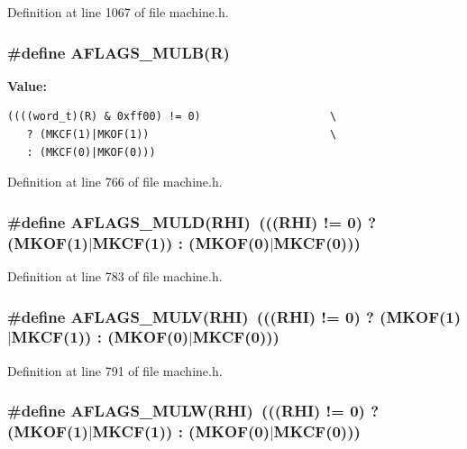 Definition at line 1067 of file machine.h.
\subsubsection[{AFLAGS\_\-MULB}]{\setlength{\rightskip}{0pt plus 5cm}\#define AFLAGS\_\-MULB(R)}\label{machine_8h_318743491cc7dcf91bdaf5f94cad91da}


\textbf{Value:}

\begin{Code}\begin{verbatim}((((word_t)(R) & 0xff00) != 0)                    \
   ? (MKCF(1)|MKOF(1))                            \
   : (MKCF(0)|MKOF(0)))
\end{verbatim}
\end{Code}


Definition at line 766 of file machine.h.
\subsubsection[{AFLAGS\_\-MULD}]{\setlength{\rightskip}{0pt plus 5cm}\#define AFLAGS\_\-MULD(RHI)~(((RHI) != 0) ? (MKOF(1)$|$MKCF(1)) : (MKOF(0)$|$MKCF(0)))}\label{machine_8h_982001aea3d214f048dbc879a408b539}




Definition at line 783 of file machine.h.
\subsubsection[{AFLAGS\_\-MULV}]{\setlength{\rightskip}{0pt plus 5cm}\#define AFLAGS\_\-MULV(RHI)~(((RHI) != 0) ? (MKOF(1)$|$MKCF(1)) : (MKOF(0)$|$MKCF(0)))}\label{machine_8h_17d61f86127b1d76854f26c1f7884552}




Definition at line 791 of file machine.h.
\subsubsection[{AFLAGS\_\-MULW}]{\setlength{\rightskip}{0pt plus 5cm}\#define AFLAGS\_\-MULW(RHI)~(((RHI) != 0) ? (MKOF(1)$|$MKCF(1)) : (MKOF(0)$|$MKCF(0)))}\label{machine_8h_21b3ef5a4e5b1f30210d394d5ff0bb88}




